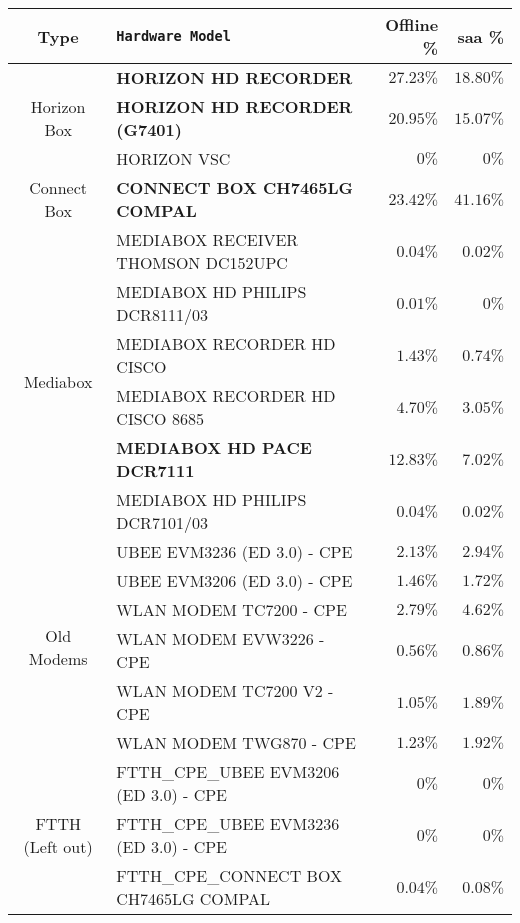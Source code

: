 \begin{table}[h]
\begin{center}
\begin{tabular}{c l r r}
\hline
\textbf{Type} & \textbf{\texttt{Hardware Model}} & \textbf{Offline \%} & \textbf{\acrshort{saa} \%}\\ 
\hline\hline
\multirow{3}{*}{Horizon Box} 		& \textbf{HORIZON HD RECORDER}					& $27.23\%$ 			& $\mathbf{18.80\%}$\\
									& \textbf{HORIZON HD RECORDER (G7401)} 			& $20.95\%$ 			& $\mathbf{15.07\%}$\\
									& HORIZON VSC									& $0\%$ 				& $0\%$\\
\hline						
Connect Box							& \textbf{CONNECT BOX CH7465LG COMPAL}			& $23.42\%$ 			& $\mathbf{41.16\%}$\\
\hline
\multirow{6}{*}{Mediabox} 			& MEDIABOX RECEIVER THOMSON DC152UPC 			& $0.04\%$ 				& $0.02\%$\\
									& MEDIABOX HD PHILIPS DCR8111/03 				& $0.01\%$ 				& $0\%$\\
									& MEDIABOX RECORDER HD CISCO						& $1.43\%$ 				& $0.74\%$\\
									& MEDIABOX RECORDER HD CISCO 8685				& $4.70\%$ 				& $3.05\%$\\
									& \textbf{MEDIABOX HD PACE DCR7111}				& $12.83\%$ 			& $\mathbf{7.02\%}$\\
									& MEDIABOX HD PHILIPS DCR7101/03					& $0.04\%$ 				& $0.02\%$\\
\hline
\multirow{6}{*}{Old Modems} 			& UBEE EVM3236 (ED 3.0) - CPE 					& $2.13\%$ 				& $2.94\%$\\
									& UBEE EVM3206 (ED 3.0) - CPE 					& $1.46\%$ 				& $1.72\%$\\
									& WLAN MODEM TC7200 - CPE						& $2.79\%$ 				& $4.62\%$\\
									& WLAN MODEM EVW3226 - CPE						& $0.56\%$ 				& $0.86\%$\\
									& WLAN MODEM TC7200 V2 - CPE						& $1.05\%$ 				& $1.89\%$\\
									& WLAN MODEM TWG870 - CPE						& $1.23\%$ 				& $1.92\%$\\
\hline 
\multirow{13}{*}{FTTH (Left out)} 	& FTTH\_CPE\_UBEE EVM3206 (ED 3.0) - CPE 		& $0\%$ 				& $0\%$\\
									& FTTH\_CPE\_UBEE EVM3236 (ED 3.0) - CPE 		& $0\%$ 				& $0\%$\\
									& FTTH\_CPE\_CONNECT BOX CH7465LG COMPAL			& $0.04\%$ 				& $0.08\%$\\

\end{tabular}
\end{center}
\end{table}

